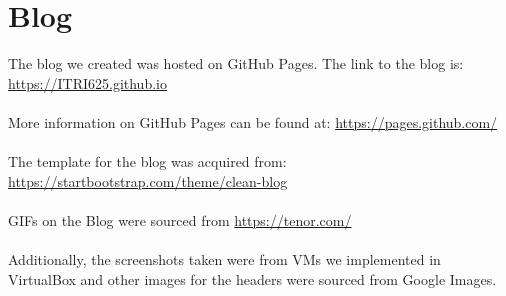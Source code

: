 \documentclass[a4paper, 12pt, titlepage]{report}
\begin{document}
\section{Blog}
The blog we created was hosted on GitHub Pages. The link to the blog is:\\
\url{https://ITRI625.github.io}\\\\
More information on GitHub Pages can be found at: \url{https://pages.github.com/}\\\\
The template for the blog was acquired from:\\
\url{https://startbootstrap.com/theme/clean-blog}\\\\
GIFs on the Blog were sourced from \url{https://tenor.com/}\\\\
Additionally, the screenshots taken were from VMs we implemented in VirtualBox and other images for the headers were sourced from Google Images.
\end{document}

